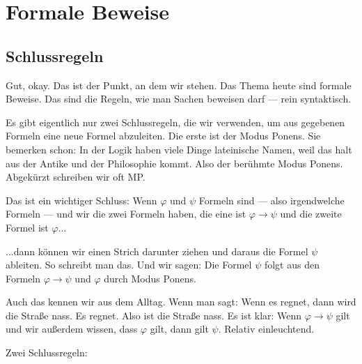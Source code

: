 \section{Formale Beweise}
\subsection{Schlussregeln}

\begin{spoken-clean}[00:11:28 - 00:13:30]
Gut, okay. Das ist der Punkt, an dem wir stehen. Das Thema heute sind formale Beweise. Das sind die Regeln, wie man Sachen beweisen darf --- rein syntaktisch. 

Es gibt eigentlich nur zwei Schlussregeln, die wir verwenden, um aus gegebenen Formeln eine neue Formel abzuleiten. Die erste ist der Modus Ponens. Sie bemerken schon: In der Logik haben viele Dinge lateinische Namen, weil das halt aus der Antike und der Philosophie kommt. Also der berühmte Modus Ponens. Abgekürzt schreiben wir oft MP.

Das ist ein wichtiger Schluss: Wenn $\varphi$ und $\psi$ Formeln sind --- also irgendwelche Formeln --- und wir die zwei Formeln haben, die eine ist $\varphi \to \psi$ und die zweite Formel ist $\varphi$...
\end{spoken-clean}

\begin{spoken-clean}[00:13:30 - 00:15:23]
...dann können wir einen Strich darunter ziehen und daraus die Formel $\psi$ ableiten. So schreibt man das. Und wir sagen: Die Formel $\psi$ folgt aus den Formeln $\varphi \to \psi$ und $\varphi$ durch Modus Ponens.

Auch das kennen wir aus dem Alltag. Wenn man sagt: Wenn es regnet, dann wird die Straße nass. Es regnet. Also ist die Straße nass. Es ist klar: Wenn $\varphi \to \psi$ gilt und wir außerdem wissen, dass $\varphi$ gilt, dann gilt $\psi$. Relativ einleuchtend.
\end{spoken-clean}

\begin{math-stroke}
Zwei Schlussregeln:
\end{math-stroke}

